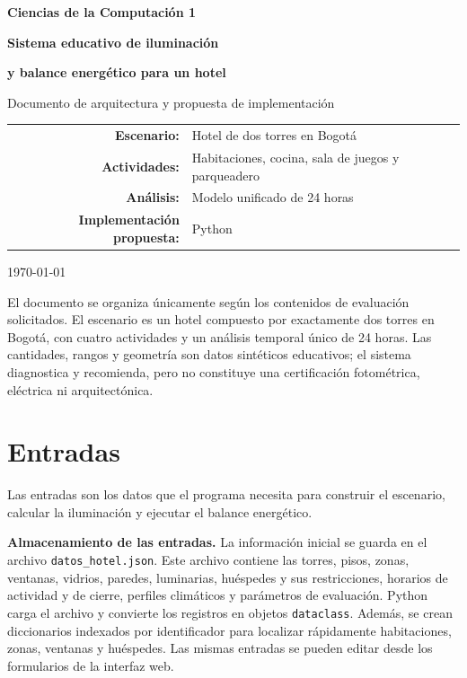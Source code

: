 \documentclass[12pt,a4paper]{article}
\newcommand{\codigo}[1]{\texttt{#1}}
\begin{document}
\begin{titlepage}
    \centering
    \vspace*{1.5cm}
    {\Large \textbf{Ciencias de la Computación 1}\par}
    \vspace{0.9cm}
    {\Huge \textbf{Sistema educativo de iluminación}\par}
    {\Huge \textbf{y balance energético para un hotel}\par}
    \vspace{1.2cm}
    {\Large Documento de arquitectura y propuesta de implementación\par}
    \vfill
    \begin{tabular}{rl}
        \textbf{Escenario:} & Hotel de dos torres en Bogotá\\
        \textbf{Actividades:} & Habitaciones, cocina, sala de juegos y parqueadero\\
        \textbf{Análisis:} & Modelo unificado de 24 horas\\
        \textbf{Implementación propuesta:} & Python\\
    \end{tabular}
    \vfill
    {\large \today\par}
\end{titlepage}

\tableofcontents
\newpage

El documento se organiza únicamente según los contenidos de evaluación solicitados. El escenario es un hotel compuesto por exactamente dos torres en Bogotá, con cuatro actividades y un análisis temporal único de 24 horas. Las cantidades, rangos y geometría son datos sintéticos educativos; el sistema diagnostica y recomienda, pero no constituye una certificación fotométrica, eléctrica ni arquitectónica.

\section{Entradas}

Las entradas son los datos que el programa necesita para construir el escenario, calcular la iluminación y ejecutar el balance energético.

\textbf{Almacenamiento de las entradas.} La información inicial se guarda en el archivo \codigo{datos\_hotel.json}. Este archivo contiene las torres, pisos, zonas, ventanas, vidrios, paredes, luminarias, huéspedes y sus restricciones, horarios de actividad y de cierre, perfiles climáticos y parámetros de evaluación. Python carga el archivo y convierte los registros en objetos \codigo{dataclass}. Además, se crean diccionarios indexados por identificador para localizar rápidamente habitaciones, zonas, ventanas y huéspedes. Las mismas entradas se pueden editar desde los formularios de la interfaz web.
\end{document}
